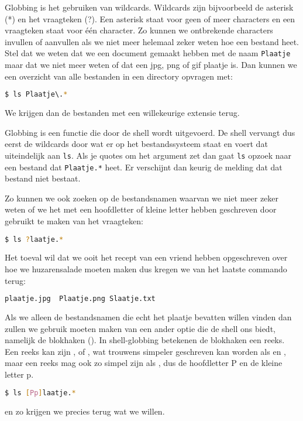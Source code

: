 Globbing is het gebruiken van wildcards. Wildcards zijn bijvoorbeeld de asterisk (*) en het vraagteken (?). Een asterisk staat voor geen of meer characters en een vraagteken staat voor \'{e}\'{e}n character. Zo kunnen we ontbrekende characters invullen of aanvullen als we niet meer helemaal zeker weten hoe een bestand heet. Stel dat we weten dat we een document gemaakt hebben met de naam \texttt{Plaatje} maar dat we niet meer weten of dat een jpg, png of gif plaatje is. Dan kunnen we een overzicht van alle bestanden in een directory opvragen met:
\begin{lstlisting}[language=bash]
$ ls Plaatje\.*
\end{lstlisting}
We krijgen dan de bestanden met een willekeurige extensie terug.

Globbing is een functie die door de shell wordt uitgevoerd. De shell vervangt dus eerst de wildcards door wat er op het bestandssysteem staat en voert dat uiteindelijk aan \texttt{ls}. Als je quotes om het argument zet dan gaat \texttt{ls} opzoek naar een bestand dat \verb|Plaatje.*| heet. Er verschijnt dan keurig de melding dat dat bestand niet bestaat.

Zo kunnen we ook zoeken op de bestandsnamen waarvan we niet meer zeker weten of we het met een hoofdletter of kleine letter hebben geschreven door gebruikt te maken van het vraagteken:
\begin{lstlisting}[language=bash]
$ ls ?laatje.*
\end{lstlisting}

Het toeval wil dat we ooit het recept van een vriend hebben opgeschreven over hoe we huzarensalade moeten maken dus kregen we van het laatste commando terug:
\begin{lstlisting}[language=bash]
plaatje.jpg  Plaatje.png Slaatje.txt
\end{lstlisting}

Als we alleen de bestandsnamen die echt het plaatje bevatten willen vinden dan zullen we gebruik moeten maken van een ander optie die de shell ons biedt, namelijk de blokhaken (\big[\big]). In shell-globbing betekenen de blokhaken een reeks. Een reeks kan zijn \big[1234567890\big], of , wat trouwens simpeler geschreven kan worden als \big[0-9\big] en \big[a-g\big], maar een reeks mag ook zo simpel zijn als \big[pP\big], dus de hoofdletter P en de kleine letter p.
\begin{lstlisting}[language=bash]
$ ls [Pp]laatje.*
\end{lstlisting}
en zo krijgen we precies terug wat we willen.

